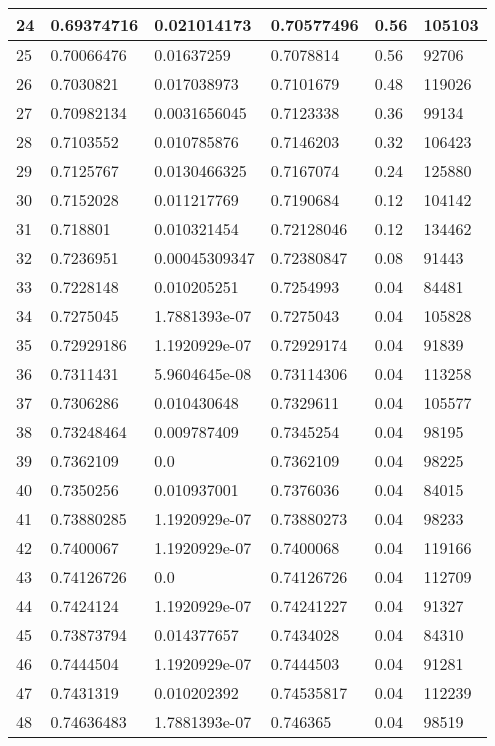 \begin{longtable}{|l|l|l|l|l|l|}
24 & 0.69374716 & 0.021014173 & 0.70577496 & 0.56 & 105103 \\ \hline 
25 & 0.70066476 & 0.01637259 & 0.7078814 & 0.56 & 92706 \\ \hline 
26 & 0.7030821 & 0.017038973 & 0.7101679 & 0.48 & 119026 \\ \hline 
27 & 0.70982134 & 0.0031656045 & 0.7123338 & 0.36 & 99134 \\ \hline 
28 & 0.7103552 & 0.010785876 & 0.7146203 & 0.32 & 106423 \\ \hline 
29 & 0.7125767 & 0.0130466325 & 0.7167074 & 0.24 & 125880 \\ \hline 
30 & 0.7152028 & 0.011217769 & 0.7190684 & 0.12 & 104142 \\ \hline 
31 & 0.718801 & 0.010321454 & 0.72128046 & 0.12 & 134462 \\ \hline 
32 & 0.7236951 & 0.00045309347 & 0.72380847 & 0.08 & 91443 \\ \hline 
33 & 0.7228148 & 0.010205251 & 0.7254993 & 0.04 & 84481 \\ \hline 
34 & 0.7275045 & 1.7881393e-07 & 0.7275043 & 0.04 & 105828 \\ \hline 
35 & 0.72929186 & 1.1920929e-07 & 0.72929174 & 0.04 & 91839 \\ \hline 
36 & 0.7311431 & 5.9604645e-08 & 0.73114306 & 0.04 & 113258 \\ \hline 
37 & 0.7306286 & 0.010430648 & 0.7329611 & 0.04 & 105577 \\ \hline 
38 & 0.73248464 & 0.009787409 & 0.7345254 & 0.04 & 98195 \\ \hline 
39 & 0.7362109 & 0.0 & 0.7362109 & 0.04 & 98225 \\ \hline 
40 & 0.7350256 & 0.010937001 & 0.7376036 & 0.04 & 84015 \\ \hline 
41 & 0.73880285 & 1.1920929e-07 & 0.73880273 & 0.04 & 98233 \\ \hline 
42 & 0.7400067 & 1.1920929e-07 & 0.7400068 & 0.04 & 119166 \\ \hline 
43 & 0.74126726 & 0.0 & 0.74126726 & 0.04 & 112709 \\ \hline 
44 & 0.7424124 & 1.1920929e-07 & 0.74241227 & 0.04 & 91327 \\ \hline 
45 & 0.73873794 & 0.014377657 & 0.7434028 & 0.04 & 84310 \\ \hline 
46 & 0.7444504 & 1.1920929e-07 & 0.7444503 & 0.04 & 91281 \\ \hline 
47 & 0.7431319 & 0.010202392 & 0.74535817 & 0.04 & 112239 \\ \hline 
48 & 0.74636483 & 1.7881393e-07 & 0.746365 & 0.04 & 98519 \\ \hline 

\end{longtable}
